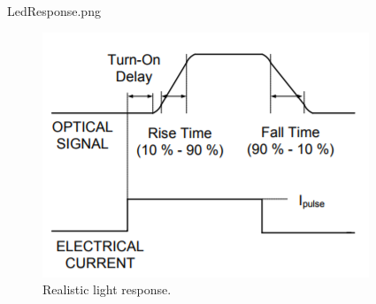 LedResponse.png
\begin{figure}[!h]
	\includegraphics[width=\textwidth]{pics/LedResponse.png}
	\caption{Realistic light response.}
	\label{fig:LedOnTime}
\end{figure}


